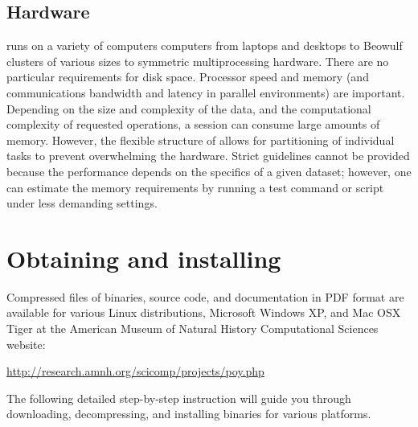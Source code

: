 \subsection{Hardware}
\poy runs on a variety of computers computers from laptops and desktops to Beowulf clusters 
of various sizes to symmetric multiprocessing hardware. There are no
particular requirements for disk space. Processor speed and memory (and
communications bandwidth and latency in parallel environments) are important.
Depending on the size and complexity of the data, and the computational
complexity of requested operations, a \poy session can consume large amounts of memory.
However, the flexible structure of \poy allows for partitioning of individual
tasks to prevent overwhelming the hardware. Strict guidelines cannot be
provided because the performance depends on the specifics of a given
dataset; however, one can estimate the memory requirements by running a test command
or script under less demanding settings.

\section{Obtaining and installing \poy}

Compressed files of \poy binaries, source code, and documentation in PDF format are available 
for various Linux distributions, Microsoft Windows XP, and Mac OSX Tiger at the American Museum 
of Natural History Computational Sciences \poy website:
\begin{center}
\url{http://research.amnh.org/scicomp/projects/poy.php}
\end{center}
The following detailed step-by-step instruction will guide you through downloading,  decompressing, and installing \poy binaries for various platforms.

